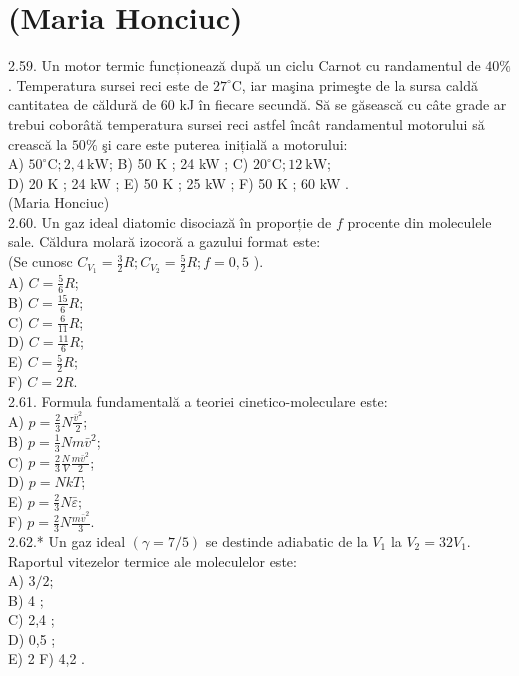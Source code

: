 \section*{(Maria Honciuc)}
2.59. Un motor termic funcționează după un ciclu Carnot cu randamentul de $40 \%$. Temperatura sursei reci este de $27^{\circ} \mathrm{C}$, iar maşina primeşte de la sursa caldă cantitatea de căldură de 60 kJ în fiecare secundă. Să se găsească cu câte grade ar trebui coborâtă temperatura sursei reci astfel încât randamentul motorului să crească la $50 \%$ şi care este puterea inițială a motorului:\\
A) $50^{\circ} \mathrm{C} ; 2,4 \mathrm{~kW}$; B) 50 K ; 24 kW ; C) $20^{\circ} \mathrm{C} ; 12 \mathrm{~kW}$;\\
D) 20 K ; 24 kW ; E) 50 K ; 25 kW ; F) 50 K ; 60 kW .\\
(Maria Honciuc)\\
2.60. Un gaz ideal diatomic disociază în proporție de $f$ procente din moleculele sale. Căldura molară izocoră a gazului format este:\\
(Se cunosc $C_{V_{1}}=\frac{3}{2} R ; C_{V_{2}}=\frac{5}{2} R ; f=0,5$ ).\\
A) $C=\frac{5}{6} R$;\\
B) $C=\frac{15}{6} R$;\\
C) $C=\frac{6}{11} R$;\\
D) $C=\frac{11}{6} R$;\\
E) $C=\frac{5}{2} R$;\\
F) $C=2 R$.\\
2.61. Formula fundamentală a teoriei cinetico-moleculare este:\\
A) $p=\frac{2}{3} N \frac{\bar{v}^{2}}{2}$;\\
B) $p=\frac{1}{3} N m \bar{v}^{2}$;\\
C) $p=\frac{2}{3} \frac{N}{V} \frac{m \bar{v}^{2}}{2}$;\\
D) $p=N k T$;\\
E) $p=\frac{2}{3} N \bar{\varepsilon}$;\\
F) $p=\frac{2}{3} N \frac{m \bar{v}^{2}}{3}$.\\
2.62.* Un gaz ideal $(\gamma=7 / 5)$ se destinde adiabatic de la $V_{1}$ la $V_{2}=32 V_{1}$. Raportul vitezelor termice ale moleculelor este:\\
A) $3 / 2$;\\
B) 4 ;\\
C) 2,4 ;\\
D) 0,5 ;\\
E) 2 F) 4,2 .\\
